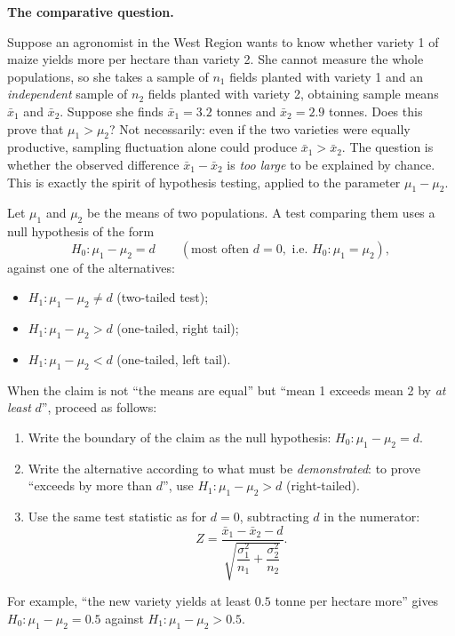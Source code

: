 \documentclass[11pt]{article}
\begin{document}
\textbf{The comparative question.}\par
Suppose an agronomist in the West Region wants to know whether variety 1 of maize yields more per hectare than variety 2. She cannot measure the whole populations, so she takes a sample of $n_1$ fields planted with variety 1 and an \emph{independent} sample of $n_2$ fields planted with variety 2, obtaining sample means $\bar{x}_1$ and $\bar{x}_2$. Suppose she finds $\bar{x}_1 = 3.2$ tonnes and $\bar{x}_2 = 2.9$ tonnes. Does this prove that $\mu_1 > \mu_2$? Not necessarily: even if the two varieties were equally productive, sampling fluctuation alone could produce $\bar{x}_1 > \bar{x}_2$. The question is whether the observed difference $\bar{x}_1 - \bar{x}_2$ is \emph{too large} to be explained by chance. This is exactly the spirit of hypothesis testing, applied to the parameter $\mu_1 - \mu_2$.

\begin{definition}
Let $\mu_1$ and $\mu_2$ be the means of two populations. A test comparing them uses a null hypothesis of the form
\[ H_0 : \mu_1 - \mu_2 = d \qquad (\text{most often } d = 0, \text{ i.e. } H_0 : \mu_1 = \mu_2), \]
against one of the alternatives:
\begin{itemize}
\item $H_1 : \mu_1 - \mu_2 \neq d$ \quad (two-tailed test);
\item $H_1 : \mu_1 - \mu_2 > d$ \quad (one-tailed, right tail);
\item $H_1 : \mu_1 - \mu_2 < d$ \quad (one-tailed, left tail).
\end{itemize}
\end{definition}

\begin{methode}
When the claim is not ``the means are equal'' but ``mean 1 exceeds mean 2 by \emph{at least} $d$'', proceed as follows:
\begin{enumerate}
\item Write the boundary of the claim as the null hypothesis: $H_0 : \mu_1 - \mu_2 = d$.
\item Write the alternative according to what must be \emph{demonstrated}: to prove ``exceeds by more than $d$'', use $H_1 : \mu_1 - \mu_2 > d$ (right-tailed).
\item Use the same test statistic as for $d = 0$, subtracting $d$ in the numerator:
\[ Z = \frac{\bar{x}_1 - \bar{x}_2 - d}{\sqrt{\dfrac{\sigma_1^2}{n_1} + \dfrac{\sigma_2^2}{n_2}}}. \]
\end{enumerate}
For example, ``the new variety yields at least $0.5$ tonne per hectare more'' gives $H_0 : \mu_1 - \mu_2 = 0.5$ against $H_1 : \mu_1 - \mu_2 > 0.5$.
\end{methode}
\end{document}
